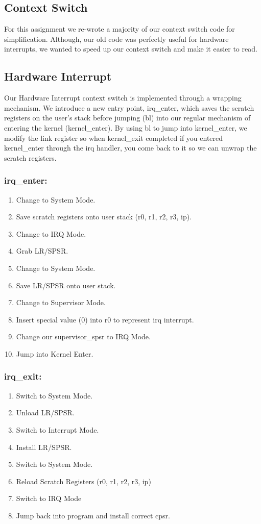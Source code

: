 \documentclass{article}
\begin{document}
\subsection{Context Switch}

For this assignment we re-wrote a majority of our context switch code for simplification. Although, our old code was perfectly useful for hardware interrupts, we wanted to speed up our context switch and make it easier to read.

\subsection{Hardware Interrupt}

Our Hardware Interrupt context switch is implemented through a wrapping mechanism. We introduce a new entry point, irq\_enter, which saves the scratch registers on the user's stack before jumping (bl) into our regular mechanism of entering the kernel (kernel\_enter). By using bl to jump into kernel\_enter, we modify the link register so when kernel\_exit completed if you entered kernel\_enter through the irq handler, you come back to it so we can unwrap the scratch registers.

\subsubsection{irq\_enter:}
\begin{enumerate}
    \item Change to System Mode.
    \item Save scratch registers onto user stack (r0, r1, r2, r3, ip).
    \item Change to IRQ Mode.
    \item Grab LR/SPSR.
    \item Change to System Mode. 
    \item Save LR/SPSR onto user stack.
    \item Change to Supervisor Mode.
    \item Insert special value (0) into r0 to represent irq interrupt.
    \item Change our supervisor\_spsr to IRQ Mode.
    \item Jump into Kernel Enter.
\end{enumerate}

\subsubsection{irq\_exit:}
\begin{enumerate}
    \item Switch to System Mode.
    \item Unload LR/SPSR.
    \item Switch to Interrupt Mode.
    \item Install LR/SPSR.
    \item Switch to System Mode.
    \item Reload Scratch Registers (r0, r1, r2, r3, ip)
    \item Switch to IRQ Mode
    \item Jump back into program and install correct cpsr.
\end{enumerate}
\end{document}
